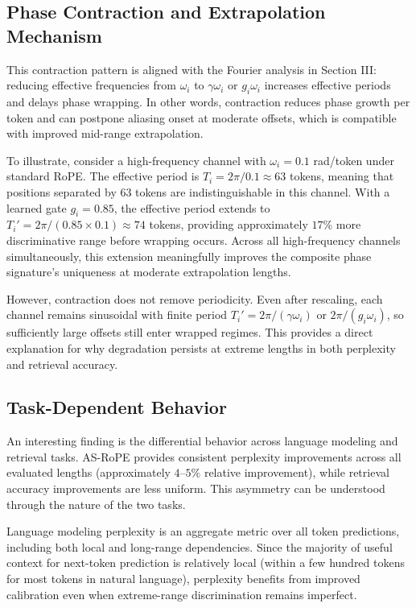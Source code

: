 \documentclass[conference]{IEEEtran}
\begin{document}
\subsection{Phase Contraction and Extrapolation Mechanism}
This contraction pattern is aligned with the Fourier analysis in Section III: reducing effective frequencies from $\omega_i$ to $\gamma\omega_i$ or $g_i\omega_i$ increases effective periods and delays phase wrapping. In other words, contraction reduces phase growth per token and can postpone aliasing onset at moderate offsets, which is compatible with improved mid-range extrapolation.

To illustrate, consider a high-frequency channel with $\omega_i = 0.1$ rad/token under standard RoPE. The effective period is $T_i = 2\pi / 0.1 \approx 63$ tokens, meaning that positions separated by $63$ tokens are indistinguishable in this channel. With a learned gate $g_i = 0.85$, the effective period extends to $T_i' = 2\pi / (0.85 \times 0.1) \approx 74$ tokens, providing approximately $17\%$ more discriminative range before wrapping occurs. Across all high-frequency channels simultaneously, this extension meaningfully improves the composite phase signature's uniqueness at moderate extrapolation lengths.

However, contraction does not remove periodicity. Even after rescaling, each channel remains sinusoidal with finite period $T_i'=2\pi/(\gamma\omega_i)$ or $2\pi/(g_i\omega_i)$, so sufficiently large offsets still enter wrapped regimes. This provides a direct explanation for why degradation persists at extreme lengths in both perplexity and retrieval accuracy.

\subsection{Task-Dependent Behavior}
An interesting finding is the differential behavior across language modeling and retrieval tasks. AS-RoPE provides consistent perplexity improvements across all evaluated lengths (approximately $4$--$5\%$ relative improvement), while retrieval accuracy improvements are less uniform. This asymmetry can be understood through the nature of the two tasks.

Language modeling perplexity is an aggregate metric over all token predictions, including both local and long-range dependencies. Since the majority of useful context for next-token prediction is relatively local (within a few hundred tokens for most tokens in natural language), perplexity benefits from improved calibration even when extreme-range discrimination remains imperfect.
\end{document}
